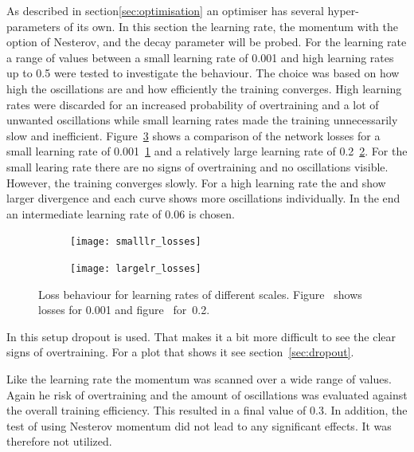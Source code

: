 As described in section\ref{sec:optimisation} an optimiser has several hyper-parameters of its own. In this section the learning rate, the momentum with the option of Nesterov, and the decay parameter will be probed.
For the learning rate a range of values between a small learning rate of \num{0.001} and high learning rates up to \num{0.5} were tested to investigate the behaviour. The choice was based on how high the oscillations are and how efficiently the training converges. High learning rates were discarded for an increased probability of overtraining and a lot of unwanted oscillations while small learning rates made the training unnecessarily slow and inefficient. Figure~\ref{fig:lr} shows a comparison of the network losses for a small learning rate of \num{0.001}~\ref{fig:lr:small} and a relatively large learning rate of \num{0.2}~\ref{fig:lr:large}. For the small learing rate there are no signs of overtraining and no oscillations visible. However, the training converges slowly. For a high learning rate the \losstrain and \losstest show larger divergence and each curve shows more oscillations individually. In the end an intermediate learning rate of \num{0.06} is chosen.

\begin{figure}[htbp]
    \centering
    \begin{subfigure}[b]{0.48\textwidth}
        \texttt{[image: smalllr\_losses]}
        \caption{}
        \label{fig:lr:small}
    \end{subfigure}
\quad
    \begin{subfigure}[b]{0.48\textwidth}
        \texttt{[image: largelr\_losses]}
        \caption{}
        \label{fig:lr:large}
    \end{subfigure}
    \caption{Loss behaviour for learning rates of different scales. Figure~ shows losses for \num{0.001} and figure~ for~\num{0.2}.}
	\label{fig:lr}
\end{figure}

In this setup dropout is used. That makes it a bit more difficult to see the clear signs of overtraining. For a plot that shows it see section~\ref{sec:dropout}.

Like the learning rate the momentum was scanned over a wide range of values. Again he risk of overtraining and the amount of oscillations was evaluated against the overall training efficiency. This resulted in a final value of \num{0.3}. In addition, the test of using Nesterov momentum did not lead to any significant effects. It was therefore not utilized.

